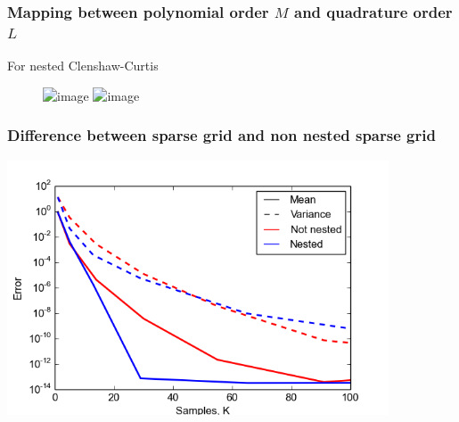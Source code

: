 \documentclass{beamer}
\begin{document}
  
  \begin{frame}
   \frametitle{Mapping between polynomial order $M$ and quadrature order $L$}
   For nested Clenshaw-Curtis
   \begin{figure}
    \includegraphics<1>[width=0.85\textwidth]{LvsM1.png}
    \includegraphics<2>[width=0.85\textwidth]{LvsM.png}
   \end{figure}

   

  \end{frame}

  
  
  \begin{frame}
 \frametitle{Difference between sparse grid and non nested sparse grid}
 \begin{center}
                 \includegraphics[width=0.85\textwidth]{convergence_2D_L_sparse.png}

          \end{center}
% 
% 
% 
\end{frame}
  
\end{document}
